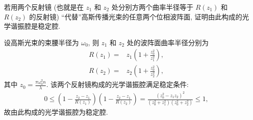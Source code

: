 \documentclass[twoside]{note}
\begin{document}
\begin{exe}
    若用两个反射镜 (也就是在 $z_1$ 和 $z_2$ 处分别方两个曲率半径等于 $R(z_1)$ 和 $R(z_2)$ 的反射镜) ``代替''高斯传播光束的任意两个位相波阵面, 证明由此构成的光学谐振腔是稳定腔.
\end{exe}
\begin{pf}
    设高斯光束的束腰半径为 $\omega_0$, 则 $z_1$ 和 $z_2$ 处的波阵面曲率半径分别为
    \begin{align}
        R(z_1)=&z_1\left(1+\frac{z_0^2}{z_1^2}\right),\\
        R(z_2)=&z_2\left(1+\frac{z_0^2}{z_2^2}\right),
    \end{align}
    其中 $z_0=\frac{\pi\omega_0^2n}{\lambda}$.
    该两个反射镜构成的光学谐振腔满足稳定条件:
    \begin{align}
        0\leq\left(1-\frac{z_2-z_1}{R(z_1)}\right)\left(1-\frac{z_2-z_1}{R(z_2)}\right)=\frac{(z_0^2-z_1z_2)^2}{(z_0^2+z_1^2)(z_0^2+z_2^2)}\leq 1,
    \end{align}
    故由此构成的光学谐振腔为稳定腔.
\end{pf}
\end{document}

